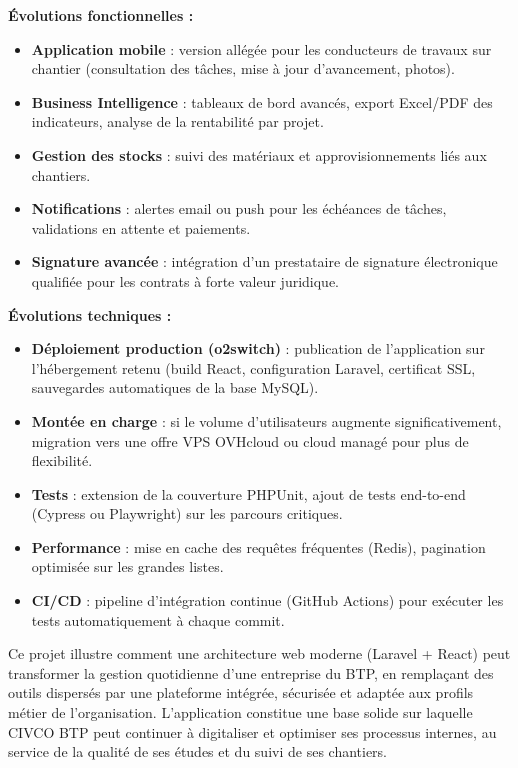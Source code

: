 \textbf{Évolutions fonctionnelles :}
\begin{itemize}
  \item \textbf{Application mobile} : version allégée pour les conducteurs de travaux
  sur chantier (consultation des tâches, mise à jour d'avancement, photos).
  \item \textbf{Business Intelligence} : tableaux de bord avancés, export Excel/PDF
  des indicateurs, analyse de la rentabilité par projet.
  \item \textbf{Gestion des stocks} : suivi des matériaux et approvisionnements liés
  aux chantiers.
  \item \textbf{Notifications} : alertes email ou push pour les échéances de tâches,
  validations en attente et paiements.
  \item \textbf{Signature avancée} : intégration d'un prestataire de signature
  électronique qualifiée pour les contrats à forte valeur juridique.
\end{itemize}

\textbf{Évolutions techniques :}
\begin{itemize}
  \item \textbf{Déploiement production (o2switch)} : publication de l'application sur
  l'hébergement retenu (build React, configuration Laravel, certificat SSL, sauvegardes
  automatiques de la base MySQL).
  \item \textbf{Montée en charge} : si le volume d'utilisateurs augmente significativement,
  migration vers une offre VPS OVHcloud ou cloud managé pour plus de flexibilité.
  \item \textbf{Tests} : extension de la couverture PHPUnit, ajout de tests
  end-to-end (Cypress ou Playwright) sur les parcours critiques.
  \item \textbf{Performance} : mise en cache des requêtes fréquentes (Redis),
  pagination optimisée sur les grandes listes.
  \item \textbf{CI/CD} : pipeline d'intégration continue (GitHub Actions) pour
  exécuter les tests automatiquement à chaque commit.
\end{itemize}

\medskip

Ce projet illustre comment une architecture web moderne (Laravel + React) peut
transformer la gestion quotidienne d'une entreprise du BTP, en remplaçant des outils
dispersés par une plateforme intégrée, sécurisée et adaptée aux profils métier de
l'organisation. L'application constitue une base solide sur laquelle CIVCO BTP peut
continuer à digitaliser et optimiser ses processus internes, au service de la qualité
de ses études et du suivi de ses chantiers.

\newpage
